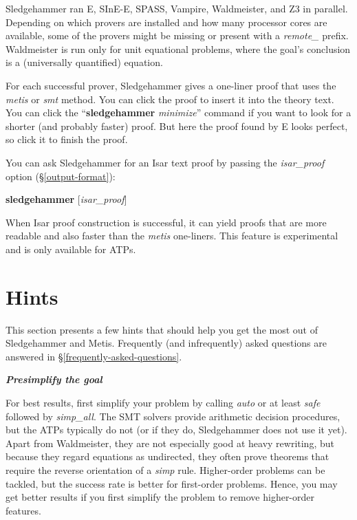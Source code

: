 \documentclass[a4paper,12pt]{article}
\begin{document}
Sledgehammer ran E, SInE-E, SPASS, Vampire, Waldmeister, and Z3 in parallel.
Depending on which provers are installed and how many processor cores are
available, some of the provers might be missing or present with a
\textit{remote\_} prefix. Waldmeister is run only for unit equational problems,
where the goal's conclusion is a (universally quantified) equation.

For each successful prover, Sledgehammer gives a one-liner proof that uses the
\textit{metis} or \textit{smt} method. You can click the proof to insert it into
the theory text. You can click the ``\textbf{sledgehammer} \textit{minimize}''
command if you want to look for a shorter (and probably faster) proof. But here
the proof found by E looks perfect, so click it to finish the proof.

You can ask Sledgehammer for an Isar text proof by passing the
\textit{isar\_proof} option (\S\ref{output-format}):

\prew
\textbf{sledgehammer} [\textit{isar\_proof}]
\postw

When Isar proof construction is successful, it can yield proofs that are more
readable and also faster than the \textit{metis} one-liners. This feature is
experimental and is only available for ATPs.

\section{Hints}
\label{hints}

This section presents a few hints that should help you get the most out of
Sledgehammer and Metis. Frequently (and infrequently) asked questions are
answered in \S\ref{frequently-asked-questions}.

\newcommand\point[1]{\medskip\par{\sl\bfseries#1}\par\nopagebreak}

\point{Presimplify the goal}

For best results, first simplify your problem by calling \textit{auto} or at
least \textit{safe} followed by \textit{simp\_all}. The SMT solvers provide
arithmetic decision procedures, but the ATPs typically do not (or if they do,
Sledgehammer does not use it yet). Apart from Waldmeister, they are not
especially good at heavy rewriting, but because they regard equations as
undirected, they often prove theorems that require the reverse orientation of a
\textit{simp} rule. Higher-order problems can be tackled, but the success rate
is better for first-order problems. Hence, you may get better results if you
first simplify the problem to remove higher-order features.
\end{document}
